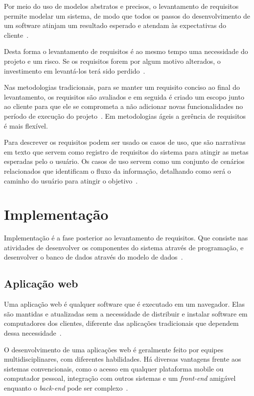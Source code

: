 Por meio do uso de modelos abstratos e precisos, o levantamento de requisitos permite modelar um sistema, de modo que todos os passos do desenvolvimento de um software atinjam um resultado esperado e atendam às expectativas do cliente~\cite{pressman2016engenharia}.

Desta forma o levantamento de requisitos é ao mesmo tempo uma necessidade do projeto e um risco.
Se os requisitos forem por algum motivo alterados, o investimento em levantá-los terá sido perdido~\cite{schimiguel2017tecnicas}.

Nas metodologias tradicionais, para se manter um requisito conciso ao final do levantamento, os requisitos são avaliados e em seguida é criado um escopo junto ao cliente para que ele se comprometa a não adicionar novas funcionalidades no período de execução do projeto~\cite{lutz2018implantaccao}.
Em metodologias ágeis a gerência de requisitos é mais flexível.


Para descrever os requisitos podem ser usado os casos de uso, que são narrativas em texto que servem como registro de requisitos do sistema para atingir as metas esperadas pelo o usuário.
Os casos de uso servem como um conjunto de cenários relacionados que identificam o fluxo da informação, detalhando como será o caminho do usuário para atingir o objetivo~\cite{larman2002utilizando}.

\section{Implementação}

Implementação é a fase posterior ao levantamento de requisitos.
Que consiste nas atividades de desenvolver os componentes do sistema através de programação, e desenvolver o banco de dados através do modelo de dados~\cite{azevedo2008definiccao}.

\subsection{Aplicação web}

Uma aplicação web é qualquer software que é executado em um navegador.
Elas são mantidas e atualizadas sem a necessidade de distribuir e instalar software em computadores dos clientes, diferente das aplicações tradicionais que dependem dessa necessidade~\cite{sampaio2004xwebprocess}.

O desenvolvimento de uma aplicações web é geralmente feito por equipes multidisciplinares, com diferentes habilidades.
Há diversas vantagens frente aos sistemas convencionais, como o acesso em qualquer plataforma mobile ou computador pessoal, integração com outros sistemas e um \textit{front-end} amigável enquanto o \textit{back-end} pode ser complexo~\cite{ferreira2015arquitetutura}. 

